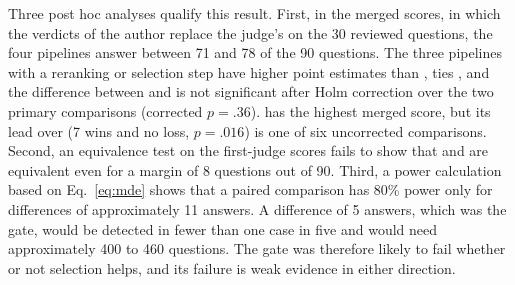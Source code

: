 Three post hoc analyses qualify this result. First, in the merged scores, in which the verdicts of the author replace the judge's on the 30 reviewed questions, the four pipelines answer between 71 and 78 of the 90 questions. The three pipelines with a reranking or selection step have higher point estimates than \hybrid{}, \lexb{} ties \hr{}, and the difference between \lexb{} and \hybrid{} is not significant after Holm correction over the two primary comparisons (corrected $p=.36$). \setr{} has the highest merged score, but its lead over \hybrid{} (7 wins and no loss, $p=.016$) is one of six uncorrected comparisons. Second, an equivalence test \citep{schuirmann1987tost} on the first-judge scores fails to show that \lexb{} and \hr{} are equivalent even for a margin of 8 questions out of 90. Third, a power calculation based on Eq.~\ref{eq:mde} shows that a paired comparison has 80\% power only for differences of approximately 11 answers. A difference of 5 answers, which was the gate, would be detected in fewer than one case in five and would need approximately 400 to 460 questions. The gate was therefore likely to fail whether or not selection helps, and its failure is weak evidence in either direction.

